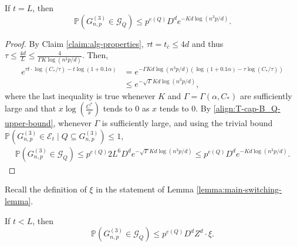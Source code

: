 \documentclass[11pt,a4paper,oneside,reqno]{amsart}
\newcommand{\Gnp}{G_{n, p}^{(3)}}
\newcommand{\cE}{\mathcal{E}}
\newcommand{\cG}{\mathcal{G}}
\renewcommand{\Pr}{\mathbb{P}}
\newcommand{\1}{\mathbbm{1}} %
\renewcommand{\le}{\leqslant}
\begin{document}
\begin{claim}
    If $t = L$, then
    \[
        \Pr\left(\Gnp \in \cG_Q\right) \le p^{e(Q)} D^{d} e^{-K d \log(n^3 p / d)}.
    \]
\end{claim}
\begin{proof}
    By Claim \ref{claim:alg-properties}, $\tau t = t_{\bar{c}} \le 4d$ and thus $\tau \le \frac{4d}{L} \le \frac{4}{\Gamma K \log(n^3 p / d)}$. Then,
    \begin{align*}
        e^{\tau t \cdot \log(C_{*}/\tau) - t \log\left(1+0.1\alpha\right)} 
        &= e^{-\Gamma K d \log(n^3 p / d) \left(\log\left(1+0.1\alpha\right)  -\tau \log(C_{*}/\tau)\right)} \\
        &\le e^{-\sqrt{\Gamma} K d \log(n^3 p / d)},
    \end{align*}        
    where the last inequality is true whenever $K$ and $\Gamma = \Gamma(\alpha, C_{*})$ are sufficiently large and that $x \log\left(\frac{C^*}{x}\right)$ tends to $0$ as $x$ tends to $0$. By \eqref{align:T-cap-B_Q-upper-bound}, whenever $\Gamma$ is sufficiently large, and using the trivial bound $\Pr\left(\Gnp \in \cE_t \mid Q \subseteq \Gnp\right) \le 1$,
    \begin{align*}
        \Pr\left(\Gnp \in \cG_Q\right) \le p^{e(Q)} 2 L^{6} D^{d} e^{-\sqrt{\Gamma} K d \log(n^3 p / d)} \le p^{e(Q)} D^{d} e^{-K d \log(n^3 p / d)}.
    \end{align*}
\end{proof}
Recall the definition of $\xi$ in the statement of Lemma \ref{lemma:main-switching-lemma}.
\begin{claim}
    If $t < L$, then
    \[
        \Pr\left(\Gnp \in \cG_Q\right) \le p^{e(Q)} D^{d} Z^{d} \cdot \xi.
    \]
\end{claim}
\end{document}
